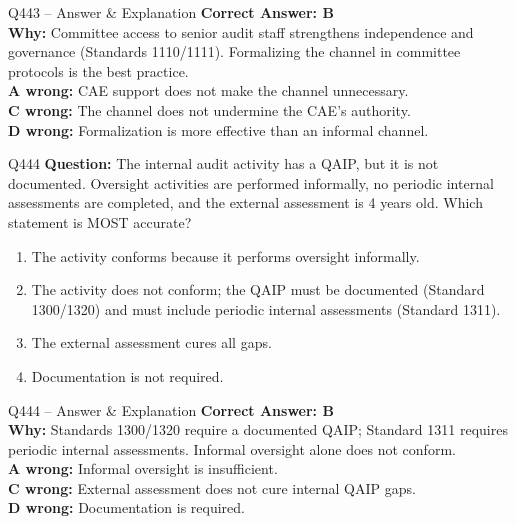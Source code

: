 \documentclass[aspectratio=169,10pt]{beamer}
\begin{document}
	\begin{frame}[t]{Q443 -- Answer \& Explanation}
		\small
		\textbf{Correct Answer: B} \\[4pt]
		\textbf{Why:} Committee access to senior audit staff strengthens independence and governance (Standards 1110/1111). Formalizing the channel in committee protocols is the best practice. \\[4pt]
		\textbf{A wrong:} CAE support does not make the channel unnecessary. \\[2pt]
		\textbf{C wrong:} The channel does not undermine the CAE's authority. \\[2pt]
		\textbf{D wrong:} Formalization is more effective than an informal channel.
	\end{frame}
	
	
	\begin{frame}[t]{Q444}
		\small
		\textbf{Question:} The internal audit activity has a QAIP, but it is not documented. Oversight activities are performed informally, no periodic internal assessments are completed, and the external assessment is 4 years old. Which statement is MOST accurate?
		\begin{enumerate}[label=\Alph*.,itemsep=1pt,topsep=2pt]
			\item The activity conforms because it performs oversight informally.
			\item The activity does not conform; the QAIP must be documented (Standard 1300/1320) and must include periodic internal assessments (Standard 1311).
			\item The external assessment cures all gaps.
			\item Documentation is not required.
		\end{enumerate}
	\end{frame}
	
	\begin{frame}[t]{Q444 -- Answer \& Explanation}
		\small
		\textbf{Correct Answer: B} \\[4pt]
		\textbf{Why:} Standards 1300/1320 require a documented QAIP; Standard 1311 requires periodic internal assessments. Informal oversight alone does not conform. \\[4pt]
		\textbf{A wrong:} Informal oversight is insufficient. \\[2pt]
		\textbf{C wrong:} External assessment does not cure internal QAIP gaps. \\[2pt]
		\textbf{D wrong:} Documentation is required.
	\end{frame}
	
\end{document}
